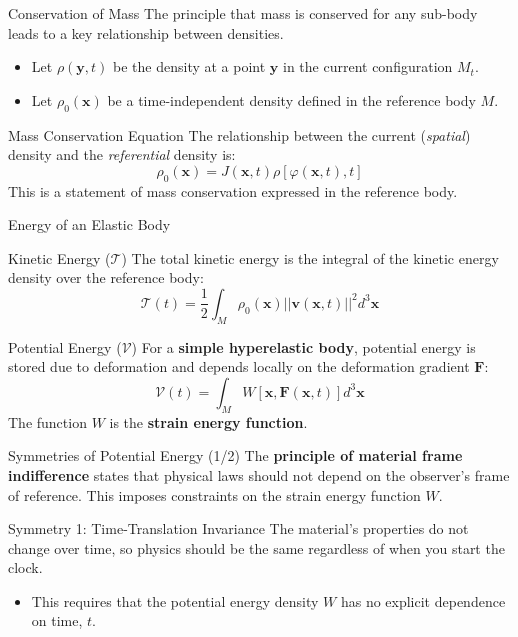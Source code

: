\documentclass{beamer}
\begin{document}
\begin{frame}{Conservation of Mass}
    The principle that mass is conserved for any sub-body leads to a key relationship between densities.
    
    \begin{itemize}
        \item Let $\rho(\mathbf{y}, t)$ be the density at a point $\mathbf{y}$ in the current configuration $M_t$.
        \item Let $\rho_0(\mathbf{x})$ be a time-independent density defined in the reference body $M$.
    \end{itemize}
    \pause
    
    \begin{alertblock}{Mass Conservation Equation}
        The relationship between the current (\textit{spatial}) density and the \textit{referential} density is:
        $$ \rho_0(\mathbf{x}) = J(\mathbf{x}, t) \rho[\varphi(\mathbf{x}, t), t] $$
        This is a statement of mass conservation expressed in the reference body.
    \end{alertblock}
\end{frame}

\begin{frame}{Energy of an Elastic Body}
    \begin{block}{Kinetic Energy ($\mathcal{T}$)}
        The total kinetic energy is the integral of the kinetic energy density over the reference body:
        $$ \mathcal{T}(t) = \frac{1}{2}\int_{M} \rho_0(\mathbf{x}) ||\mathbf{v}(\mathbf{x}, t)||^2 d^3\mathbf{x} $$
    \end{block}
    \pause
    
    \begin{block}{Potential Energy ($\mathcal{V}$)}
        For a \textbf{simple hyperelastic body}, potential energy is stored due to deformation and depends locally on the deformation gradient $\mathbf{F}$:
        $$ \mathcal{V}(t) = \int_{M} W[\mathbf{x}, \mathbf{F}(\mathbf{x}, t)] d^3\mathbf{x} $$
        The function $W$ is the \textbf{strain energy function}.
    \end{block}
\end{frame}


\begin{frame}{Symmetries of Potential Energy (1/2)}
    The \textbf{principle of material frame indifference} states that physical laws should not depend on the observer's frame of reference. This imposes constraints on the strain energy function $W$.
    \pause
    \begin{block}{Symmetry 1: Time-Translation Invariance}
        The material's properties do not change over time, so physics should be the same regardless of when you start the clock.
        \begin{itemize}
            \item This requires that the potential energy density $W$ has no explicit dependence on time, $t$.
        \end{itemize}
    \end{block}
\end{frame}
\end{document}
